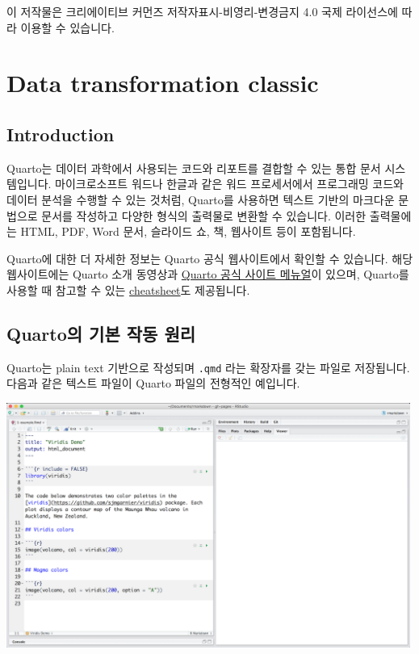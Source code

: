 \documentclass[
  a4paper,
]{book}
\begin{document}
이 저작물은 크리에이티브 커먼즈 저작자표시-비영리-변경금지 4.0 국제
라이선스에 따라 이용할 수 있습니다.


\hypertarget{data-transformation-classic}{%
\chapter{Data transformation
classic}\label{data-transformation-classic}}

\hypertarget{introduction-2}{%
\section{Introduction}\label{introduction-2}}

Quarto는 데이터 과학에서 사용되는 코드와 리포트를 결합할 수 있는 통합
문서 시스템입니다. 마이크로소프트 워드나 한글과 같은 워드 프로세서에서
프로그래밍 코드와 데이터 분석을 수행할 수 있는 것처럼, Quarto를 사용하면
텍스트 기반의 마크다운 문법으로 문서를 작성하고 다양한 형식의 출력물로
변환할 수 있습니다. 이러한 출력물에는 HTML, PDF, Word 문서, 슬라이드 쇼,
책, 웹사이트 등이 포함됩니다.

Quarto에 대한 더 자세한 정보는 Quarto 공식 웹사이트에서 확인할 수
있습니다. 해당 웹사이트에는 Quarto 소개 동영상과
\href{https://quarto.org/docs/}{Quarto 공식 사이트 메뉴얼}이 있으며,
Quarto를 사용할 때 참고할 수 있는
\href{https://quarto.org/docs/cheatsheets/quarto}{cheatsheet}도
제공됩니다.

\hypertarget{quartouxc758-uxae30uxbcf8-uxc791uxb3d9-uxc6d0uxb9ac-1}{%
\section{Quarto의 기본 작동
원리}\label{quartouxc758-uxae30uxbcf8-uxc791uxb3d9-uxc6d0uxb9ac-1}}

Quarto는 plain text 기반으로 작성되며 \texttt{.qmd} 라는 확장자를 갖는
파일로 저장됩니다. 다음과 같은 텍스트 파일이 Quarto 파일의 전형적인
예입니다.

\includegraphics[width=5.20833in,height=\textheight]{images/rmarkdown/how-1-file.png}
\end{document}

